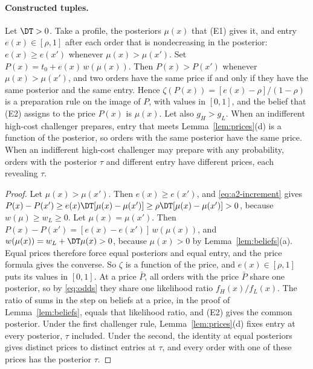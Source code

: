 
\paragraph{Constructed tuples.}
Let \(\DT>0\). Take a profile, the posteriors \(\mu(x)\) that (E1) gives it, and entry \(e(x)\in[\rho,1]\) after
each order that is nondecreasing in the posterior: \(e(x)\ge e(x')\) whenever \(\mu(x)>\mu(x')\). Set
\(P(x)=t_0+e(x)\,w(\mu(x))\). Then \(P(x)>P(x')\) whenever \(\mu(x)>\mu(x')\), and two orders have the same price if
and only if they have the same posterior and the same entry. Hence \(\zeta(P(x))=[e(x)-\rho]/(1-\rho)\) is a
preparation rule on the image of \(P\), with values in \([0,1]\), and the belief that (E2) assigns to the price
\(P(x)\) is \(\mu(x)\). Let also \(g_H>g_L\). When an indifferent high-cost challenger prepares, entry that meets
Lemma~\ref{lem:prices}(d) is a function of the posterior, so orders with the same posterior have the same price.
When an indifferent high-cost challenger may prepare with any probability, orders with the posterior \(\tau\)
and different entry have different prices, each revealing \(\tau\).

\begin{proof}
Let \(\mu(x)>\mu(x')\). Then \(e(x)\ge e(x')\), and \eqref{eq:a2-increment} gives
\(P(x)-P(x')\ge e(x)\DT[\mu(x)-\mu(x')]\ge\rho\DT[\mu(x)-\mu(x')]>0\), because \(w(\mu)\ge w_L\ge0\). Let
\(\mu(x)=\mu(x')\). Then \(P(x)-P(x')=[e(x)-e(x')]\,w(\mu(x))\), and \(w(\mu(x))=w_L+\DT\mu(x)>0\), because
\(\mu(x)>0\) by Lemma~\ref{lem:beliefs}(a). Equal prices therefore force equal posteriors and equal entry, and the
price formula gives the converse. So \(\zeta\) is a function of the price, and \(e(x)\in[\rho,1]\) puts its values in
\([0,1]\). At a price \(\bar P\), all orders with the price \(\bar P\) share one posterior, so by \eqref{eq:odds}
they share one likelihood ratio \(f_H(x)/f_L(x)\). The ratio of sums in the step on beliefs at a price, in the
proof of Lemma~\ref{lem:beliefs}, equals that likelihood ratio, and (E2) gives the common posterior. Under the
first challenger rule, Lemma~\ref{lem:prices}(d) fixes entry at every posterior, \(\tau\) included. Under the second,
the identity at equal posteriors gives distinct prices to distinct entries at \(\tau\), and every order with one of
these prices has the posterior \(\tau\).

\end{proof}

